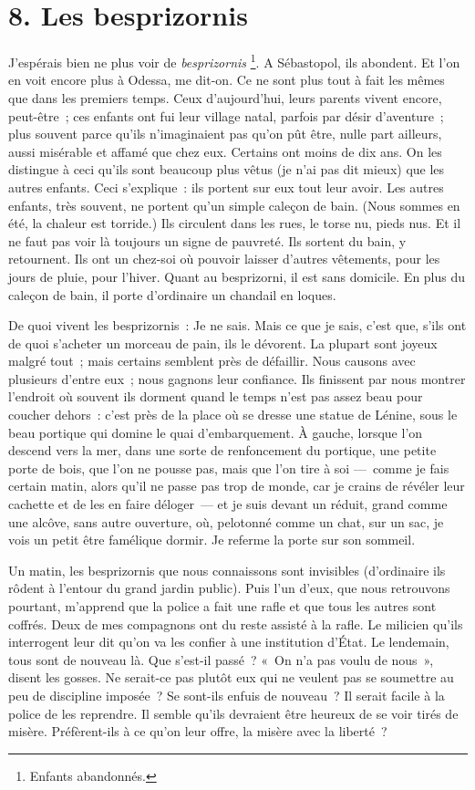 \documentclass[french,twoside]{book} %
\begin{document}
\section[{8. Les besprizornis}]{8. Les besprizornis}

\noindent J’espérais bien ne plus voir de \emph{besprizornis} \footnote{Enfants abandonnés.}. A Sébastopol, ils abondent. Et l’on en voit encore plus à Odessa, me dit-on. Ce ne sont plus tout à fait les mêmes que dans les premiers temps. Ceux d’aujourd’hui, leurs parents vivent encore, peut-être ; ces enfants ont fui leur village natal, parfois par désir d’aventure ; plus souvent parce qu’ils n’imaginaient pas qu’on pût être, nulle part ailleurs, aussi misérable et affamé que chez eux. Certains ont moins de dix ans. On les distingue à ceci qu’ils sont beaucoup plus vêtus (je n’ai pas dit mieux) que les autres enfants. Ceci s’explique : ils portent sur eux tout leur avoir. Les autres enfants, très souvent, ne portent qu’un simple caleçon de bain. (Nous sommes en été, la chaleur est torride.) Ils circulent dans les rues, le torse nu, pieds nus. Et il ne faut pas voir là toujours un signe de pauvreté. Ils sortent du bain, y retournent. Ils ont un chez-soi où pouvoir laisser d’autres vêtements, pour les jours de pluie, pour l’hiver. Quant au besprizorni, il est sans domicile. En plus du caleçon de bain, il porte d’ordinaire un chandail en loques.\par
De quoi vivent les besprizornis : Je ne sais. Mais ce que je sais, c’est que, s’ils ont de quoi s’acheter un morceau de pain, ils le dévorent. La plupart sont joyeux malgré tout ; mais certains semblent près de défaillir. Nous causons avec plusieurs d’entre eux ; nous gagnons leur confiance. Ils finissent par nous montrer l’endroit où souvent ils dorment quand le temps n’est pas assez beau pour coucher dehors : c’est près de la place où se dresse une statue de Lénine, sous le beau portique qui domine le quai d’embarquement. À gauche, lorsque l’on descend vers la mer, dans une sorte de renfoncement du portique, une petite porte de bois, que l’on ne pousse pas, mais que l’on tire à soi — comme je fais certain matin, alors qu’il ne passe pas trop de monde, car je crains de révéler leur cachette et de les en faire déloger — et je suis devant un réduit, grand comme une alcôve, sans autre ouverture, où, pelotonné comme un chat, sur un sac, je vois un petit être famélique dormir. Je referme la porte sur son sommeil.\par
Un matin, les besprizornis que nous connaissons sont invisibles (d’ordinaire ils rôdent à l’entour du grand jardin public). Puis l’un d’eux, que nous retrouvons pourtant, m’apprend que la police a fait une rafle et que tous les autres sont coffrés. Deux de mes compagnons ont du reste assisté à la rafle. Le milicien qu’ils interrogent leur dit qu’on va les confier à une institution d’État. Le lendemain, tous sont de nouveau là. Que s’est-il passé ? « On n’a pas voulu de nous », disent les gosses. Ne serait-ce pas plutôt eux qui ne veulent pas se soumettre au peu de discipline imposée ? Se sont-ils enfuis de nouveau ? Il serait facile à la police de les reprendre. Il semble qu’ils devraient être heureux de se voir tirés de misère. Préfèrent-ils à ce qu’on leur offre, la misère avec la liberté ?\par
\end{document}
